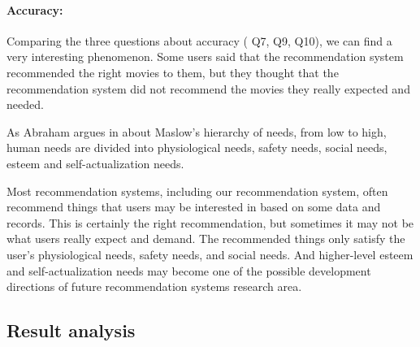\paragraph{Accuracy:}
Comparing the three questions about accuracy ( Q7, Q9, Q10), we can find a very interesting phenomenon. Some users said that the recommendation system recommended the right movies to them, but they thought that the recommendation system did not recommend the movies they really expected and needed.
\par As Abraham argues in \cite{maslow1943theory} about Maslow's hierarchy of needs, from low to high, human needs are divided into physiological needs, safety needs, social needs, esteem and self-actualization needs.
\par Most recommendation systems, including our recommendation system, often recommend things that users may be interested in based on some data and records. This is certainly the right recommendation, but sometimes it may not be what users really expect and demand. The recommended things only satisfy the user's physiological needs, safety needs, and social needs. And higher-level esteem and self-actualization needs may become one of the possible development directions of future recommendation systems research area.
	
\subsection{Result analysis}

\cleardoublepage